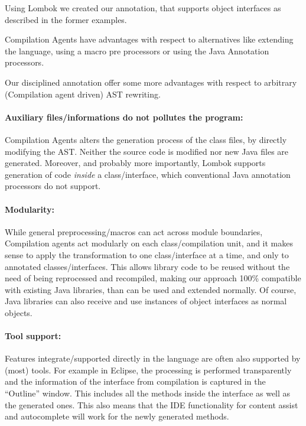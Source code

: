 Using Lombok we created our \mixin annotation, that supports object
interfaces as described in the former examples.

Compilation Agents have advantages with respect to
alternatives like extending the language, using a macro pre processors
or using the Java Annotation processors.

Our disciplined \mixin annotation offer some more advantages with respect to arbitrary (Compilation agent driven) AST rewriting.


\paragraph{Auxiliary files/informations do not pollutes the program:}
Compilation Agents alters the generation process of the class files,
by directly modifying the AST.
Neither the source code is modified nor new Java files are generated.
Moreover, and probably more importantly, Lombok supports generation of
  code \emph{inside} a class/interface, which conventional
  Java annotation processors do not support.

\paragraph{Modularity:}
While general preprocessing/macros can act across module boundaries,
Compilation agents act modularly on each class/compilation unit, and it makes
sense to apply the transformation to one class/interface at a time, and only to annotated classes/interfaces.
This allows library code to be reused without the need of being
reprocessed and recompiled, making our approach 100\% compatible with existing Java libraries, than can be used
and extended normally. Of course, Java libraries can also receive and use instances of object interfaces as normal objects.

\paragraph{Tool support:}
Features integrate/supported directly in the language are often also supported by (most) tools.
For example in Eclipse, the processing is performed transparently and the information of
the interface from compilation is captured in the ``Outline'' window. This includes
all the methods inside the interface as well as the generated ones.
This also means that the IDE functionality for content assist and autocomplete
will work for the newly generated methods.


